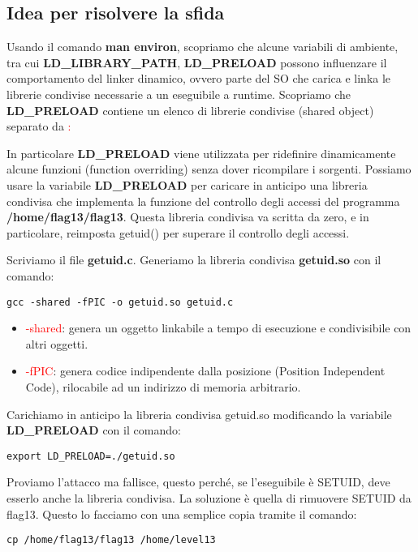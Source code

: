\subsection{Idea per risolvere la sfida}
Usando il comando \textbf{man environ}, scopriamo che alcune variabili di ambiente, tra cui \textbf{LD\_LIBRARY\_PATH}, \textbf{LD\_PRELOAD} possono influenzare il comportamento del linker dinamico, ovvero parte del SO che carica e linka le librerie condivise necessarie a un eseguibile a runtime. 
Scopriamo che \textbf{LD\_PRELOAD} contiene un elenco di librerie condivise (shared object) separato da \textcolor{red}{:}

In particolare \textbf{LD\_PRELOAD} viene utilizzata per ridefinire dinamicamente alcune funzioni (function overriding) senza dover ricompilare i sorgenti.
Possiamo usare la variabile \textbf{LD\_PRELOAD} per caricare in anticipo una libreria condivisa che implementa la funzione del controllo degli accessi del programma \textbf{/home/flag13/flag13}. Questa libreria condivisa va scritta da zero, e in particolare, reimposta getuid() per superare il controllo degli accessi.

Scriviamo il file \textbf{getuid.c}.
Generiamo la libreria condivisa \textbf{getuid.so} con il comando: 
\begin{lstlisting}[style=bashstyle]
    gcc -shared -fPIC -o getuid.so getuid.c
\end{lstlisting}

\begin{itemize}
    \item \textcolor{red}{-shared}: genera un oggetto linkabile a tempo di esecuzione e condivisibile con altri oggetti.
    \item \textcolor{red}{-fPIC}: genera codice indipendente dalla posizione (Position Independent Code), rilocabile ad un indirizzo di memoria arbitrario.
\end{itemize}

Carichiamo in anticipo la libreria condivisa getuid.so modificando la variabile \textbf{LD\_PRELOAD} con il comando:
\begin{lstlisting}[style=bashstyle]
    export LD_PRELOAD=./getuid.so
\end{lstlisting}
Proviamo l'attacco ma fallisce, questo perché, se l'eseguibile è SETUID, deve esserlo anche la libreria condivisa.
La soluzione è quella di rimuovere SETUID da flag13. Questo lo facciamo con una semplice copia tramite il comando:
\begin{lstlisting}[style=bashstyle]
    cp /home/flag13/flag13 /home/level13
\end{lstlisting} 


